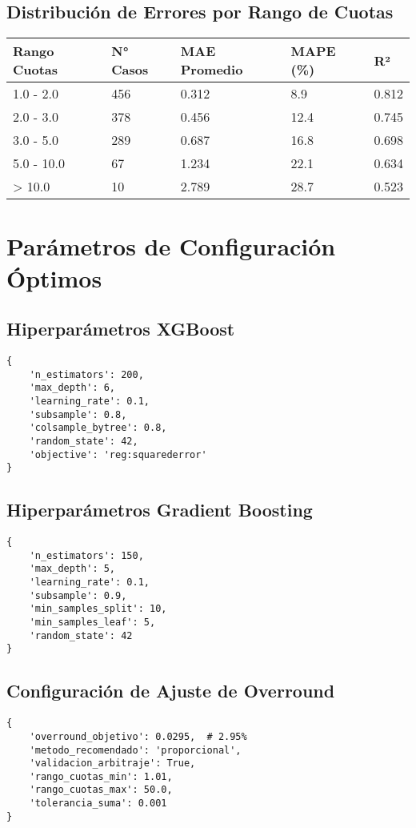 \documentclass{article}
\begin{document}
\subsection{Distribución de Errores por Rango de Cuotas}

\begin{longtable}{|p{2.5cm}|p{2cm}|p{2cm}|p{2cm}|p{2cm}|}
\hline
\textbf{Rango Cuotas} & \textbf{N° Casos} & \textbf{MAE Promedio} & \textbf{MAPE (\%)} & \textbf{R²} \\
\hline
\endhead
1.0 - 2.0 & 456 & 0.312 & 8.9 & 0.812 \\
\hline
2.0 - 3.0 & 378 & 0.456 & 12.4 & 0.745 \\
\hline
3.0 - 5.0 & 289 & 0.687 & 16.8 & 0.698 \\
\hline
5.0 - 10.0 & 67 & 1.234 & 22.1 & 0.634 \\
\hline
> 10.0 & 10 & 2.789 & 28.7 & 0.523 \\
\hline
\end{longtable}

\section{Parámetros de Configuración Óptimos}

\subsection{Hiperparámetros XGBoost}
\begin{verbatim}
{
    'n_estimators': 200,
    'max_depth': 6,
    'learning_rate': 0.1,
    'subsample': 0.8,
    'colsample_bytree': 0.8,
    'random_state': 42,
    'objective': 'reg:squarederror'
}
\end{verbatim}

\subsection{Hiperparámetros Gradient Boosting}
\begin{verbatim}
{
    'n_estimators': 150,
    'max_depth': 5,
    'learning_rate': 0.1,
    'subsample': 0.9,
    'min_samples_split': 10,
    'min_samples_leaf': 5,
    'random_state': 42
}
\end{verbatim}

\subsection{Configuración de Ajuste de Overround}
\begin{verbatim}
{
    'overround_objetivo': 0.0295,  # 2.95%
    'metodo_recomendado': 'proporcional',
    'validacion_arbitraje': True,
    'rango_cuotas_min': 1.01,
    'rango_cuotas_max': 50.0,
    'tolerancia_suma': 0.001
}
\end{verbatim}
\end{document}
